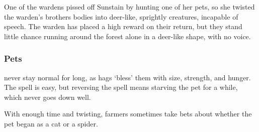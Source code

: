\begin{multicols}{2}
\begin{itemize}
  One of the \glspl{warden} pissed off Sunstain by hunting one of her pets, so she twisted the \gls{warden}'s brothers bodies into deer-like, sprightly creatures, incapable of speech.
  The \gls{warden} has placed a high reward on their return, but they stand little chance running around the forest alone in a deer-like shape, with no voice.
\end{itemize}

\subsubsection{Pets}
never stay normal for long, as hags `bless' them with size, strength, and hunger.
The spell is easy, but reversing the spell means starving the pet for a while, which never goes down well.

\ifodd\value{r4}
\else
\fi

With enough time and twisting, farmers sometimes take bets about whether the pet began as a cat or a spider.

\end{multicols}
